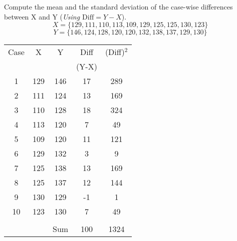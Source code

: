 \documentclass[]{article}
\begin{document}
\Large
\noindent Compute the mean and the standard deviation of the case-wise differences between X and Y (\textit{Using $\mbox{Diff} = Y-X$}).\\
\[ X = \{129, 111, 110, 113, 109, 129, 125, 125, 130, 123  \}\]
\[ Y = \{146, 124, 128, 120, 120, 132, 138, 137, 129, 130  \}\]

\centering
\begin{tabular}{|c||c|c||c|c|}
\hline
Case &     X  & Y     & Diff     &  (Diff)$^2$     	\\
\phantom{space}      &   \phantom{space}     &   \phantom{space}     & (Y-X)    &  \phantom{space} \\ \hline
1 & 129 & 146 & 17 & 289	\\
\hline
2& 111 & 124 & 13 & 169	\\
\hline
3& 110 & 128 & 18 & 324	\\
\hline
4& 113 & 120 & 7  & 49 	\\
\hline
5& 109 & 120 & 11 & 121	\\
\hline
6& 129 & 132 & 3  & 9  	\\
\hline
7& 125 & 138 & 13 & 169	\\
\hline
8& 125 & 137 & 12 & 144	\\
\hline
9& 130 & 129 & -1 & 1  	\\
\hline
10& 123 & 130 & 7  & 49 	\\ \hline
&&&&\\
&&Sum&100& 1324 \\ \hline

\end{tabular}
\end{document}
